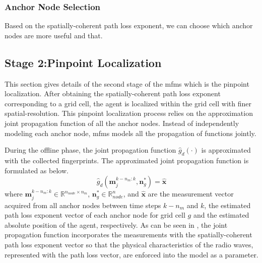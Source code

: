       \subsubsection{Anchor Node Selection}
      Based on the spatially-coherent path loss exponent, we can choose which anchor nodes are more useful and that.

    \subsection{Stage 2:Pinpoint Localization}
    This section gives details of the second stage of the \gls{mfms} which is the pinpoint localization.
    After obtaining the spatially-coherent path loss exponent corresponding to a grid cell, the agent is localized within the grid cell with finer spatial-resolution.
    This pinpoint localization process relies on the approximation joint propagation function of all the anchor nodes.
    Instead of independently modeling each anchor node, \gls{mfms} models all the propagation of functions jointly.

    During the offline phase, the joint propagation function $\hat{g}_d(\cdot)$ is approximated with the collected fingerprints.
    The approximated joint propagation function is formulated as below.
    \begin{equation}
        \label{eq:propfunct}
        \hat{g}_d(\bm{m}^{k-n_{m}:k}_j, \bm{n}^*_g)= \bm{\hat{x}}
    \end{equation}
    where $\bm{m}^{k-n_{m}:k}_j \in \mathbb{R}^{n_{node} \times n_m}$, $\bm{n}^*_g \in \mathbb{R}^n_{node}$, and $\bm{\hat{x}}$ are the measurement vector acquired from all anchor nodes between time steps $k-n_m$ and $k$, the estimated path loss exponent vector of each anchor node for grid cell $g$ and the estimated absolute position of the agent, respectively.
    As can be seen in , the joint propagation function incorporates the measurements with the spatially-coherent path loss exponent vector so that the physical characteristics of the radio waves, represented with the path loss vector, are enforced into the model as a parameter.

